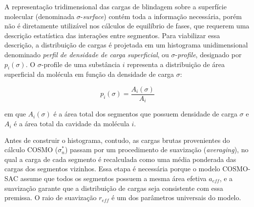 A representação tridimensional das cargas de blindagem sobre a superfície molecular (denominada $\sigma$-\textit{surface}) contém toda a informação necessária, porém não é diretamente utilizável nos cálculos de equilíbrio de fases, que requerem uma descrição estatística das interações entre segmentos. Para viabilizar essa descrição, a distribuição de cargas é projetada em um histograma unidimensional denominado \textit{perfil de densidade de carga superficial}, ou $\sigma$-\textit{profile}, designado por $p_i(\sigma)$\cite{lin2002}. O $\sigma$-profile de uma substância $i$ representa a distribuição de área superficial da molécula em função da densidade de carga $\sigma$:

\begin{equation}
    p_i(\sigma) = \frac{A_i(\sigma)}{A_i}
    \label{eq:sigma_profile}
\end{equation}

\noindent em que $A_i(\sigma)$ é a área total dos segmentos que possuem densidade de carga $\sigma$ e $A_i$ é a área total da cavidade da molécula $i$.

Antes de construir o histograma, contudo, as cargas brutas provenientes do cálculo COSMO ($\sigma_n^{*}$) passam por um procedimento de suavização (\textit{averaging}), no qual a carga de cada segmento é recalculada como uma média ponderada das cargas dos segmentos vizinhos. Essa etapa é necessária porque o modelo COSMO-SAC assume que todos os segmentos possuem a mesma área efetiva $a_{eff}$, e a suavização garante que a distribuição de cargas seja consistente com essa premissa\cite{lin2002}. O raio de suavização $r_{eff}$ é um dos parâmetros universais do modelo.

